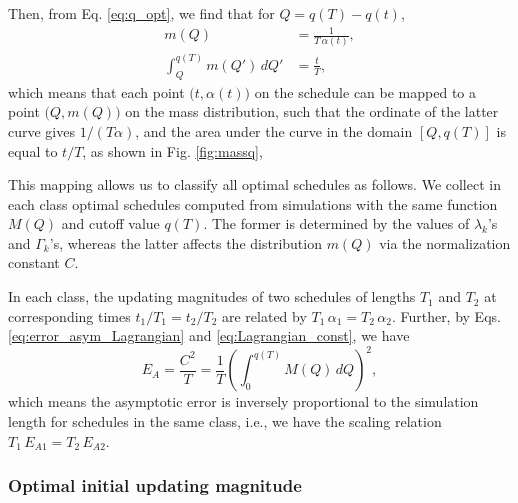 \documentclass[reprint, floatfix]{revtex4-1}
\begin{document}
Then, from Eq. \eqref{eq:q_opt},
we find that for $Q = q(T) - q(t)$,
%
\begin{align}
  m(Q)
  &=
  \frac{ 1 }
       { T \, \alpha(t) }
  ,
\label{eq:mQ_invTa}
  \\
  \int_Q^{ q(T) }
    m(Q') \, dQ'
  &=
  \frac t T
  ,
\label{eq:intmQ_tT}
\end{align}
%
which means that each point
$\bigl(t, \alpha(t)\bigr)$
on the schedule can be mapped
to a point
$\bigl(Q, m(Q)\bigr)$
on the mass distribution,
such that the ordinate of the latter curve
gives $1/(T\alpha)$,
and the area under the curve in the domain $[Q, q(T)]$
is equal to $t/T$,
as shown in Fig. \ref{fig:massq},

This mapping allows us to classify all optimal schedules
as follows.
%
We collect in each class optimal schedules
computed from simulations with the same function $M(Q)$
and cutoff value $q(T)$.
%
The former is determined by the values of
$\lambda_k$'s and $\Gamma_k$'s,
whereas the latter affects the distribution $m(Q)$
via the normalization constant $C$.


In each class, the updating magnitudes of two schedules
of lengths $T_1$ and $T_2$
at corresponding times $t_1/T_1 = t_2/T_2$
are related by $T_1 \, \alpha_1 = T_2 \, \alpha_2$.
%
Further, by Eqs.
\eqref{eq:error_asym_Lagrangian}
and
\eqref{eq:Lagrangian_const},
we have
%
\begin{equation}
  E_A
  =
  \frac { C^2 } { T }
  =
  \frac 1 T
  \left(
    \int_0^{ q(T) } M(Q) \, dQ
  \right)^2
  ,
\label{eq:error_asym2}
\end{equation}
%
which means the asymptotic error
is inversely proportional to the simulation length
for schedules in the same class,
i.e., we have the scaling relation
$T_1 \, E_{A1} = T_2 \, E_{A2}$.





\subsubsection{\label{sec:optinitalpha}
  Optimal initial updating magnitude
}
\end{document}
